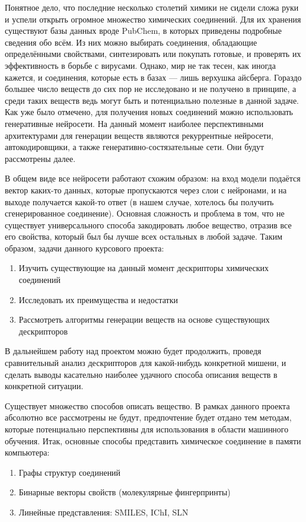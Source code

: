 \documentclass[a4paper,14pt]{extreport}
\begin{document}
Понятное дело, что последние несколько столетий химики не сидели сложа руки и успели открыть огромное множество химических соединений. Для их хранения существуют базы данных вроде PubChem, в которых приведены подробные сведения обо всём. Из них можно выбирать соединения, обладающие определёнными свойствами, синтезировать или покупать готовые, и проверять их эффективность в борьбе с вирусами.
Однако, мир не так тесен, как иногда кажется, и соединения, которые есть в базах — лишь верхушка айсберга. Гораздо большее число веществ до сих пор не исследовано и не получено в принципе, а среди таких веществ ведь могут быть и потенциально полезные в данной задаче. Как уже было отмечено, для получения новых соединений можно использовать генеративные нейросети. На данный момент наиболее перспективными архитектурами для генерации веществ являются рекуррентные нейросети, автокодировщики, а также генеративно-состязательные сети. Они будут рассмотрены далее.

В общем виде все нейросети работают схожим образом: на вход модели подаётся вектор каких-то данных, которые пропускаются через слои с нейронами, и на выходе получается какой-то ответ (в нашем случае, хотелось бы получить сгенерированное соединение). Основная сложность и проблема в том, что не существует универсального способа закодировать любое вещество, отразив все его свойства, который был бы лучше всех остальных в любой задаче. Таким образом, задачи данного курсового проекта:

\begin{enumerate}
\item Изучить существующие на данный момент дескрипторы химических соединений
\item Исследовать их преимущества и недостатки
\item Рассмотреть алгоритмы генерации веществ на основе существующих дескрипторов
\end{enumerate}

В дальнейшем работу над проектом можно будет продолжить, проведя сравнительный анализ дескрипторов для какой-нибудь конкретной мишени, и сделать выводы касательно наиболее удачного способа описания веществ в конкретной ситуации.

Существует множество способов описать вещество. В рамках данного проекта абсолютно все рассмотрены не будут, предпочтение будет отдано тем методам, которые потенциально перспективны для использования в области машинного обучения.
Итак, основные способы представить химическое соединение в памяти компьютера:
\begin{enumerate}
  \item Графы структур соединений
  \item Бинарные векторы свойств (молекулярные фингерпринты)
  \item Линейные представления: SMILES, IChI, SLN
\end{enumerate}
\end{document}
